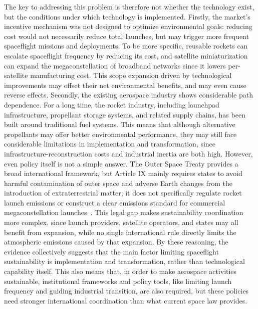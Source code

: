 \documentclass[12pt]{article}
\begin{document}
The key to addressing this problem is therefore not whether the technology exist, but the conditions under which technology is implemented. Firstly, the market's incentive mechanism was not designed to optimize environmental goals: reducing cost would not necessarily reduce total launches, but may trigger more frequent spaceflight missions and deployments. To be more specific, reusable rockets can escalate spaceflight frequency by reducing its cost, and satellite miniaturization can expand the megaconstellation of broadband networks since it lowers per-satellite manufacturing cost. This scope expansion driven by technological improvements may offset their net environmental benefits, and may even cause reverse effects. Secondly, the existing aerospace industry shows considerable path dependence. For a long time, the rocket industry, including launchpad infrastructure, propellant storage systems, and related supply chains, has been built around traditional fuel systems. This means that although alternative propellants may offer better environmental performance, they may still face considerable limitations in implementation and transformation, since infrastructure-reconstruction costs and industrial inertia are both high. However, even policy itself is not a simple answer. The Outer Space Treaty provides a broad international framework, but Article IX mainly requires states to avoid harmful contamination of outer space and adverse Earth changes from the introduction of extraterrestrial matter; it does not specifically regulate rocket launch emissions or construct a clear emissions standard for commercial megaconstellation launches~\citep[art.~IX]{un1967outerspacetreaty}. This legal gap makes sustainability coordination more complex, since launch providers, satellite operators, and states may all benefit from expansion, while no single international rule directly limits the atmospheric emissions caused by that expansion. By these reasoning, the evidence collectively suggests that the main factor limiting spaceflight sustainability is implementation and transformation, rather than technological capability itself. This also means that, in order to make aerospace activities sustainable, institutional frameworks and policy tools, like limiting launch frequency and guiding industrial transition, are also required, but these policies need stronger international coordination than what current space law provides.
\end{document}
